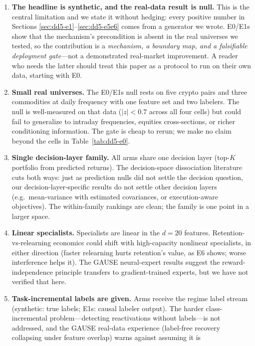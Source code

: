 \begin{enumerate}
\item \textbf{The headline is synthetic, and the real-data result is null.}
This is the central limitation and we state it without hedging: every
positive number in Sections \ref{sec:dd5-e1}--\ref{sec:dd5-e5e6} comes from
a generator we wrote. E0/E1s show that the mechanism's precondition is
absent in the real universes we tested, so the contribution is a
\emph{mechanism, a boundary map, and a falsifiable deployment gate}---not a
demonstrated real-market improvement. A reader who needs the latter should
treat this paper as a protocol to run on their own data, starting with E0.
\item \textbf{Small real universes.} The E0/E1s null rests on five crypto
pairs and three commodities at daily frequency with one feature set and two
labelers. The null is well-measured on that data ($|z| < 0.7$ across all
four cells) but could fail to generalize to intraday frequencies, equities
cross-sections, or richer conditioning information. The gate is cheap to
rerun; we make no claim beyond the cells in Table~\ref{tab:dd5-e0}.
\item \textbf{Single decision-layer family.} All arms share one decision
layer (top-$K$ portfolio from predicted returns). The decision-space
dissociation literature \citep{elmachtoub2022smart,yan2026invpnco} cuts
both ways: just as prediction nulls did not settle the decision question,
our decision-layer-specific results do not settle other decision layers
(e.g.\ mean-variance with estimated covariances, or execution-aware
objectives). The within-family rankings are clean; the family is one
point in a larger space.
\item \textbf{Linear specialists.} Specialists are linear in the $d = 20$
features. Retention-vs-relearning economics could shift with
high-capacity nonlinear specialists, in either direction (faster relearning
hurts retention's value, as E6 shows; worse interference helps it). The
GAUSE neural-expert results \citep{li2026gause} suggest the
reward-independence principle transfers to gradient-trained experts, but
we have not verified that here.
\item \textbf{Task-incremental labels are given.} Arms receive the regime
label stream (synthetic: true labels; E1s: causal labeler output). The
harder class-incremental problem---detecting reactivations without
labels---is not addressed, and the GAUSE real-data experience (label-free
recovery collapsing under feature overlap) warns against assuming it is

\end{enumerate}
